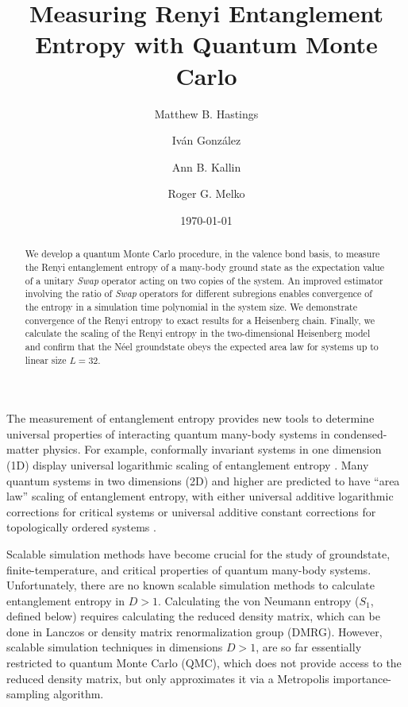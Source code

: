 \documentclass[prl,aps,twocolumn,floatfix,amsmath,amssymb,superscriptaddress,tightenlines]{revtex4}
\begin{document}
\date{\today}
\title{Measuring Renyi Entanglement Entropy with Quantum Monte Carlo}

\author{Matthew B. Hastings}

\author{Iv\'an Gonz\'alez}

\author{Ann B. Kallin}

\author{Roger G. Melko}

\begin{abstract} 


We develop a quantum Monte Carlo procedure, in the valence bond basis, to measure the Renyi entanglement entropy of a
many-body ground state as the expectation value of a unitary {\it Swap} operator acting on two copies of the system.
An improved estimator involving the ratio of {\it Swap} operators for different subregions enables convergence of the entropy in a simulation time polynomial in the system size.  We demonstrate convergence of the Renyi entropy to exact results for a Heisenberg chain. Finally, we calculate the scaling of the Renyi entropy in the two-dimensional Heisenberg model and confirm that the N\'eel groundstate obeys the expected area law for systems up to linear size $L=32$.


\end{abstract}
\maketitle

The measurement of entanglement entropy  provides
new tools to determine universal properties of interacting quantum many-body systems in condensed-matter physics.  For example, conformally invariant
systems in one dimension (1D) display universal logarithmic
scaling of entanglement entropy \cite{Cardy}.  Many
quantum systems in two dimensions (2D) and higher are predicted to have ``area law''
scaling of entanglement entropy, with
either universal additive logarithmic corrections for critical systems \cite{corner,ryu} or
universal additive constant corrections for topologically ordered systems \cite{KP,LW}.

Scalable simulation methods have become crucial for the 
study of groundstate, finite-temperature, and critical properties of quantum
many-body systems.
Unfortunately, there are 
no known scalable simulation methods to calculate entanglement entropy in $D>1$.
Calculating the von Neumann entropy ($S_1$, defined below) requires calculating
the reduced density matrix,
which can be done in Lanczos 
or density matrix renormalization group (DMRG).  However, scalable simulation techniques in dimensions $D>1$,
are so far essentially
restricted to quantum Monte Carlo (QMC), which does not provide access to the reduced density matrix, but only approximates it
via a Metropolis importance-sampling algorithm. 
\end{document}
